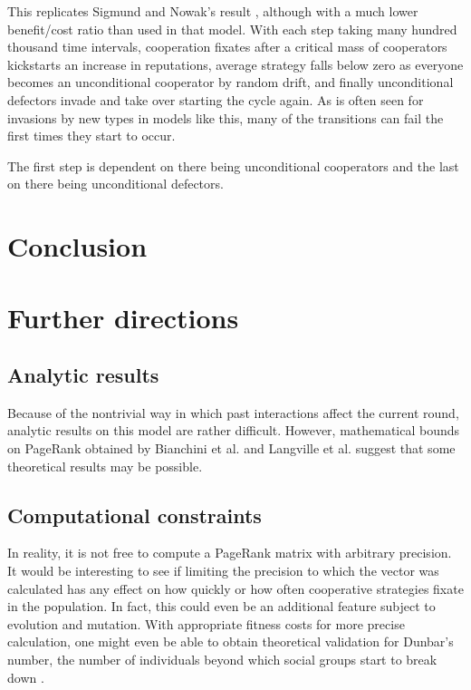 \documentclass{amsart}
\begin{document}
This replicates Sigmund and Nowak's result
\cite{nowak_evolution_1998}, although with a much lower benefit/cost
ratio than used in that model. With each step taking many hundred
thousand time intervals, cooperation fixates after a critical mass of
cooperators kickstarts an increase in reputations, average strategy
falls below zero as everyone becomes an unconditional cooperator by
random drift, and finally unconditional defectors invade and take over
starting the cycle again. As is often seen for invasions by new types
in models like this, many of the transitions can fail the first times
they start to occur.

The first step is dependent on there being unconditional cooperators
and the last on there being unconditional defectors.


\section{Conclusion}
\label{sec:conclusion}

\section{Further directions}

\subsection{Analytic results}

Because of the nontrivial way in which past interactions affect the
current round, analytic results on this model are rather
difficult. However, mathematical bounds on PageRank obtained by
Bianchini et al. \cite{bianchini_Inside_2005} and Langville et
al. \cite{langville_deeper_2004} suggest that some theoretical results
may be possible.

\subsection{Computational constraints}

In reality, it is not free to compute a PageRank matrix with arbitrary
precision. It would be interesting to see if limiting the precision to
which the vector was calculated has any effect on how quickly or how
often cooperative strategies fixate in the population. In fact, this
could even be an additional feature subject to evolution and
mutation. With appropriate fitness costs for more precise calculation,
one might even be able to obtain theoretical validation for Dunbar's
number, the number of individuals beyond which social groups start to
break down \cite{dunbar_neocortex_1995}.

 
\end{document}
